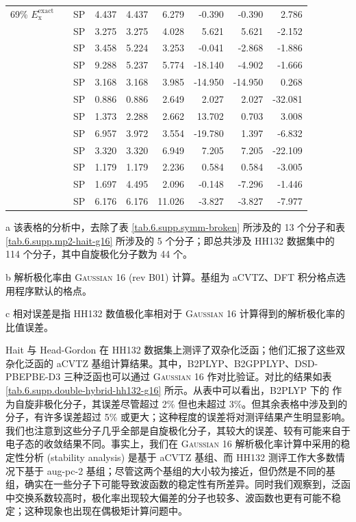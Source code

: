 \begin{table}[!htp]
{\begin{tabular}{llld{1.3}d{1.3}d{1.3}d{3.3}d{3.3}d{3.3}}
    69\% $E_\mathrm{x}^\mathrm{exact}$ &  & SP  & 4.437 & 4.437 & 6.279  & -0.390  & -0.390  & 2.786   \\
    &  & SP  & 3.275 & 3.275 & 4.028  & 5.621   & 5.621   & -2.152  \\
    &  & SP  & 3.458 & 5.224 & 3.253  & -0.041  & -2.868  & -1.886  \\
    &  & SP  & 9.288 & 5.237 & 5.774  & -18.140 & -4.902  & -1.666  \\
    &  & SP  & 3.168 & 3.168 & 3.985  & -14.950 & -14.950 & 0.268   \\
    &  & SP  & 0.886 & 0.886 & 2.649  & 2.027   & 2.027   & -32.081 \\
    &  & SP  & 1.373 & 2.288 & 2.662  & 13.702  & 0.703   & 3.008   \\
    &  & SP  & 6.957 & 3.972 & 3.554  & -19.780 & 1.397   & -6.832  \\
    &  & SP  & 3.320 & 3.320 & 6.949  & 7.205   & 7.205   & -22.109 \\
    &  & SP  & 1.179 & 1.179 & 2.236  & 0.584   & 0.584   & -3.005  \\
    &  & SP  & 1.697 & 4.495 & 2.096  & -0.148  & -7.296  & -1.446  \\
    &  & SP  & 6.176 & 6.176 & 11.026 & -3.827  & -3.827  & -7.977  \\
    \bottomrule
    \end{tabular}
}{
    \item[a] 该表格的分析中，去除了表 \ref{tab.6.supp.symm-broken} 所涉及的 13 个分子和表 \ref{tab.6.supp.mp2-hait-g16} 所涉及的 5 个分子；即总共涉及 HH132 数据集中的 114 个分子，其中自旋极化分子数为 44 个。
    \item[b] 解析极化率由 \textsc{Gaussian 16} (rev B01)\cite{Gaussian16} 计算。基组为 aCVTZ、DFT 积分格点选用程序默认的格点。
    \item[c] 相对误差是指 HH132 数值极化率相对于 \textsc{Gaussian 16} 计算得到的解析极化率的比值误差。
}
\end{table}

Hait 与 Head-Gordon 在 HH132 数据集上测评了双杂化泛函\cite{Hait-Head-Gordon.PCCP.2018}；他们汇报了这些双杂化泛函的 aCVTZ 基组计算结果。其中，B2PLYP、B2GPPLYP、DSD-PBEPBE-D3 三种泛函也可以通过 \textsc{Gaussian 16} 作对比验证。对比的结果如表 \ref{tab.6.supp.double-hybrid-hh132-g16} 所示。从表中可以看出，B2PLYP 下的  作为自旋非极化分子，其误差尽管超过 2\% 但也未超过 3\%。但其余表格中涉及到的分子，有许多误差超过 5\% 或更大；这种程度的误差将对测评结果产生明显影响。我们也注意到这些分子几乎全部是自旋极化分子，其较大的误差、较有可能来自于电子态的收敛结果不同。事实上，我们在 \textsc{Gaussian 16} 解析极化率计算中采用的稳定性分析 (stability analysis) 是基于 aCVTZ 基组、而 HH132 测评工作大多数情况下基于 aug-pc-2 基组\cite{Hait-Head-Gordon.PCCP.2018}；尽管这两个基组的大小较为接近，但仍然是不同的基组，确实在一些分子下可能导致波函数的稳定性有所差异。同时我们观察到，泛函中交换系数较高时，极化率出现较大偏差的分子也较多、波函数也更有可能不稳定；这种现象也出现在偶极矩计算问题中\cite{Gu-Xu.JCTC.2021a}。

